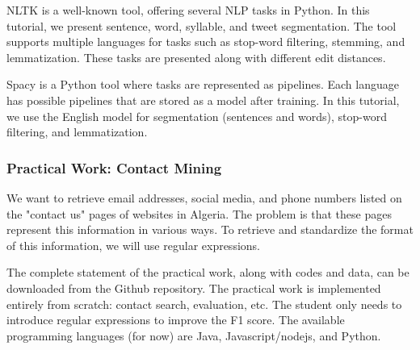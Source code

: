 \documentclass{KBook}
\begin{document}
NLTK is a well-known tool, offering several NLP tasks in Python.
In this tutorial, we present sentence, word, syllable, and tweet segmentation.
The tool supports multiple languages for tasks such as stop-word filtering, stemming, and lemmatization.
These tasks are presented along with different edit distances.

Spacy is a Python tool where tasks are represented as pipelines.
Each language has possible pipelines that are stored as a model after training.
In this tutorial, we use the English model for segmentation (sentences and words), stop-word filtering, and lemmatization.

\subsubsection*{Practical Work: Contact Mining}

We want to retrieve email addresses, social media, and phone numbers listed on the "contact us" pages of websites in Algeria.
The problem is that these pages represent this information in various ways.
To retrieve and standardize the format of this information, we will use regular expressions.

The complete statement of the practical work, along with codes and data, can be downloaded from the Github repository.
The practical work is implemented entirely from scratch: contact search, evaluation, etc.
The student only needs to introduce regular expressions to improve the F1 score.
The available programming languages (for now) are Java, Javascript/nodejs, and Python.


\ifx\wholebook\relax\else
% 
% 
	
\end{document}
